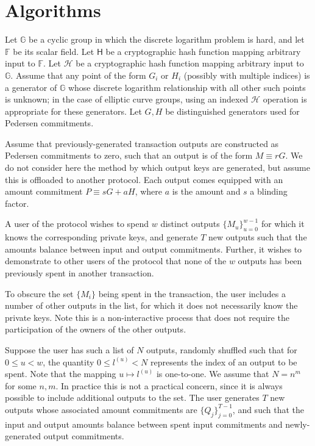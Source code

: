 \documentclass[draft]{article}
\newcommand{\G}{\mathbb{G}}
\newcommand{\F}{\mathbb{F}}
\newcommand{\hs}{\mathsf{H}}
\newcommand{\hp}{\mathcal{H}}
\begin{document}
\section{Algorithms}
Let $\G$ be a cyclic group in which the discrete logarithm problem is hard, and let $\F$ be its scalar field.
Let $\hs$ be a cryptographic hash function mapping arbitrary input to $\F$.
Let $\hp$ be a cryptographic hash function mapping arbitrary input to $\G$.
Assume that any point of the form $G_i$ or $H_i$ (possibly with multiple indices) is a generator of $\G$ whose discrete logarithm relationship with all other such points is unknown; in the case of elliptic curve groups, using an indexed $\hp$ operation is appropriate for these generators.
Let $G, H$ be distinguished generators used for Pedersen commitments.

Assume that previously-generated transaction outputs are constructed as Pedersen commitments to zero, such that an output is of the form $M \equiv rG$.
We do not consider here the method by which output keys are generated, but assume this is offloaded to another protocol.
Each output comes equipped with an amount commitment $P \equiv sG + aH$, where $a$ is the amount and $s$ a blinding factor.

A user of the protocol wishes to spend $w$ distinct outputs $\{M_u\}_{u=0}^{w-1}$ for which it knows the corresponding private keys, and generate $T$ new outputs such that the amounts balance between input and output commitments.
Further, it wishes to demonstrate to other users of the protocol that none of the $w$ outputs has been previously spent in another transaction.

To obscure the set $\{M_i\}$ being spent in the transaction, the user includes a number of other outputs in the list, for which it does not necessarily know the private keys.
Note this is a non-interactive process that does not require the participation of the owners of the other outputs.

Suppose the user has such a list of $N$ outputs, randomly shuffled such that for $0 \leq u < w$, the quantity $0 \leq l^{(u)} < N$ represents the index of an output to be spent.
Note that the mapping $u \mapsto l^{(u)}$ is one-to-one.
We assume that $N = n^m$ for some $n,m$.
In practice this is not a practical concern, since it is always possible to include additional outputs to the set.
The user generates $T$ new outputs whose associated amount commitments are $\{Q_j\}_{j=0}^{T-1}$, and such that the input and output amounts balance between spent input commitments and newly-generated output commitments.
\end{document}
